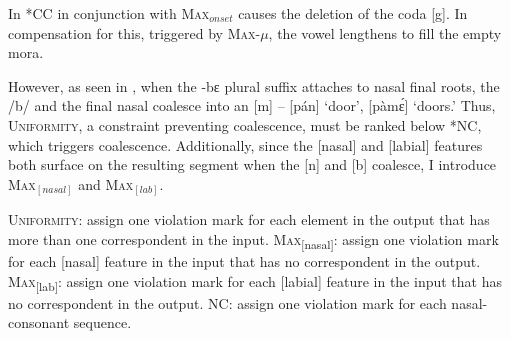 \documentclass[output=paper,colorlinks,citecolor=brown,
]{langscibook}
\begin{document}
In  *CC in conjunction with \textsc{Max}$_{onset}$ causes the deletion of the coda [g]. In compensation for this, triggered by \textsc{Max}-$\mu$, the vowel lengthens to fill the empty mora. 

However, as seen in , when the -bɛ plural suffix attaches to nasal final roots, the /b/ and the final nasal coalesce into an [m] -- [pán] `door', [pàmɛ́] `doors.' Thus, \textsc{Uniformity}, a constraint preventing coalescence, must be ranked below *NC, which triggers coalescence. Additionally, since the [nasal] and [labial] features both surface on the resulting segment when the [n] and [b] coalesce, I introduce \textsc{Max}$_{[nasal]}$ and \textsc{Max}$_{[lab]}$.

\ea \begin{xlist}
    \ex \textsc{Uniformity}: assign one violation mark for each element in the output that has more than one correspondent in the input.
    \ex \textsc{Max}\textsubscript{[nasal]}: assign one violation mark for each [nasal] feature in the input that has no correspondent in the output.
    \ex \textsc{Max}\textsubscript{[lab]}: assign one violation mark for each [labial] feature in the input that has no correspondent in the output.
    \ex *NC: assign one violation mark for each nasal-consonant sequence.
\end{xlist}
\z


\begin{table}

  \caption{Tableau illustrating the failed derivation of [pàmɛ́] `door'}
  \label{tab:Caragine:doors}
\end{table}
\end{document}
